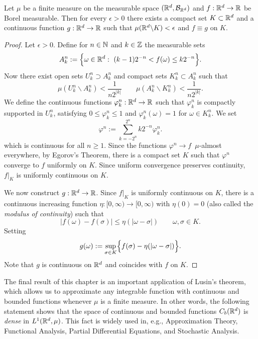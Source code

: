 \begin{theorem}\label{thm:lusin}
    Let $\mu$ be a finite measure on the measurable space $(\mathbb R^d, \mathcal B_{\mathbb R^d})$ and $f: \mathbb R^d \to \mathbb R$ be Borel measurable. 
	Then for every $\epsilon > 0$ there exists a compact set $K \subset \mathbb R^d$ and a continuous function $g: \mathbb R^d \to \mathbb R$ such that $\mu(\mathbb R^d \backslash K) < \epsilon$ and $f \equiv g$ on $K$.
\end{theorem}

\begin{proof}
	Let $\epsilon > 0$.
	Define for $n \in \mathbb N$ and $k \in \mathbb Z$ the measurable sets
	\[
	A^n_k := \Bigl\{ \omega \in \mathbb R^d : \  (k-1) 2^{-n} < f(\omega) \leq k 2^{-n} \Bigr\}.
	\]
	Now there exist open sets $U^n_k \supset A^n_k$ and compact sets $K^n_k \subset A^n_k$ such that
	\[
		\mu(U_k^n \backslash A_k^n ) < \frac{1}{n 2^{|k|}} \qquad \mu(A_k^n \backslash K_k^n ) < \frac{1}{n 2^{|k|}}.
	\]
	We define the continuous functions $\varphi_k^n: \mathbb R^d \to \mathbb R$ such that $\varphi_k^n$ is compactly supported in $U_k^n$, satisfying $0 \leq \varphi_k^n \leq 1$ and $\varphi_k^n(\omega) = 1$ for $\omega \in K_k^n$. We set
	\[
		\varphi^n := \sum_{k = -2^n}^{2^n} k 2^{-n} \varphi_k^n.
	\]
	which is continuous for all $n\ge 1$. Since the functions $\varphi^n\to f$\, $\mu$-almost everywhere, by Egorov's Theorem, there is a compact set $K$ such that $\varphi^n$ converge to $f$ uniformly on $K$. Since uniform convergence preserves continuity, $f|_K$ is uniformly continuous on $K$.
	
	We now construct $g: \mathbb R^d \to \mathbb R$. Since $f|_K$ is uniformly continuous on $K$, there is a continuous increasing function $\eta: [0,\infty) \to [0,\infty)$ with $\eta(0)=0$ (also called the \emph{modulus of continuity}) such that
	\[
		|f(\omega) - f(\sigma)| \leq \eta( |\omega-\sigma|)\qquad \omega,\sigma\in K.
	\]
	Setting
	\[
		g(\omega) := \sup_{\sigma \in K} \Bigl\{f(\sigma) - \eta(|\omega-\sigma|)\Bigr\}.
	\]
	Note that $g$ is continuous on $\mathbb R^d$ and coincides with $f$ on $K$.
\end{proof}

The final result of this chapter is an important application of Lusin's theorem, which allows us to approximate any integrable function with continuous and bounded functions whenever $\mu$ is a finite measure. In other words, the following statement shows that the space of continuous and bounded functions $C_b(\mathbb R^d)$ is \emph{dense} in $L^1(\mathbb R^d,\mu)$. This fact is widely used in, e.g., Approximation Theory, Functional Analysis, Partial Differential Equations, and Stochastic Analysis.

